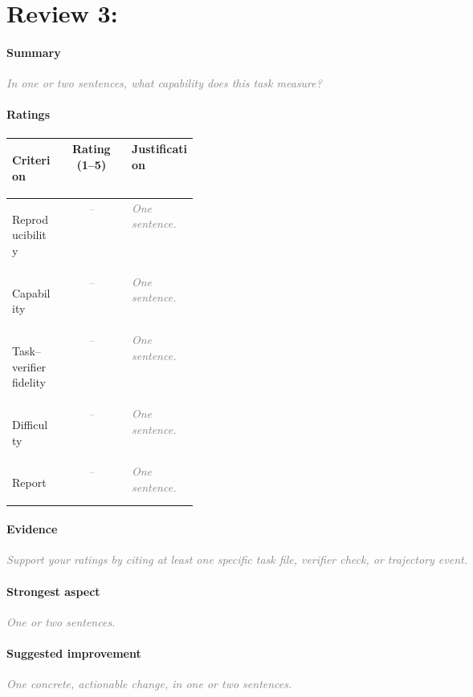 \documentclass[11pt]{article}
\newcommand{\prompt}[1]{\textcolor{gray}{\textit{#1}}}
\begin{document}
\newpage
\section*{Review 3: }

\paragraph{Summary}
\prompt{In one or two sentences, what capability does this task measure?}

\paragraph{Ratings}
\begin{center}
\renewcommand{\arraystretch}{1.3}
\begin{tabularx}{\linewidth}{>{\bfseries\raggedright\arraybackslash}p{0.27\linewidth}cX}
  \toprule
  Criterion & Rating (1--5) & Justification \\
  \midrule
  Reproducibility & \prompt{--} & \prompt{One sentence.} \\
  Capability & \prompt{--} & \prompt{One sentence.} \\
  Task--verifier fidelity & \prompt{--} & \prompt{One sentence.} \\
  Difficulty & \prompt{--} & \prompt{One sentence.} \\
  Report & \prompt{--} & \prompt{One sentence.} \\
  \bottomrule
\end{tabularx}
\end{center}

\paragraph{Evidence}
\prompt{Support your ratings by citing at least one specific task file, verifier check, or trajectory event.}

\paragraph{Strongest aspect}
\prompt{One or two sentences.}

\paragraph{Suggested improvement}
\prompt{One concrete, actionable change, in one or two sentences.}
\end{document}

